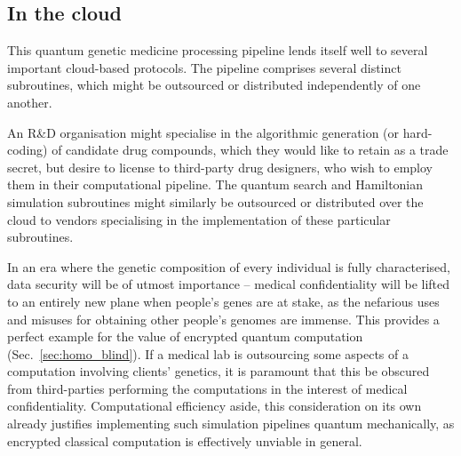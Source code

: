 %
%

\subsection{In the cloud}

This quantum genetic medicine processing pipeline lends itself well to several important cloud-based protocols. The pipeline comprises several distinct subroutines, which might be outsourced or distributed independently of one another.

An R\&D organisation might specialise in the algorithmic generation (or hard-coding) of candidate drug compounds, which they would like to retain as a trade secret, but desire to license to third-party drug designers, who wish to employ them in their computational pipeline. The quantum search and Hamiltonian simulation subroutines might similarly be outsourced or distributed over the cloud to vendors specialising in the implementation of these particular subroutines.

In an era where the genetic composition of every individual is fully characterised, data security will be of utmost importance -- medical confidentiality will be lifted to an entirely new plane when people's genes are at stake, as the nefarious uses and misuses for obtaining other people's genomes are immense. This provides a perfect example for the value of encrypted quantum computation (Sec.~\ref{sec:homo_blind}). If a medical lab is outsourcing some aspects of a computation involving clients' genetics, it is paramount that this be obscured from third-parties performing the computations in the interest of medical confidentiality. Computational efficiency aside, this consideration on its own already justifies implementing such simulation pipelines quantum mechanically, as encrypted classical computation is effectively unviable in general.